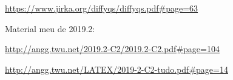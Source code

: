 \documentclass[oneside,12pt]{article}
\begin{document}
\ssk

{\scriptsize

\url{https://www.jirka.org/diffyqs/diffyqs.pdf\#page=63}

}

\msk

Material meu de 2019.2:

\ssk

{\scriptsize

\url{http://angg.twu.net/2019.2-C2/2019.2-C2.pdf\#page=104}

\url{http://angg.twu.net/LATEX/2019-2-C2-tudo.pdf\#page=14}

}

\end{document}
